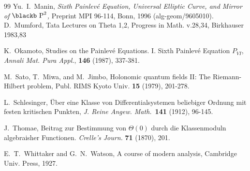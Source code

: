 \documentclass[11pt]{article}
\def\Bbb#1{\hbox{\blackb #1}}
\def\Th{\Theta}
\begin{document}
\begin{thebibliography}{99}
Yu.~I.~Manin,
{\it Sixth Painlev\'e Equation, Universal Elliptic Curve, 
and Mirror of $\Bbb P^2$,}
Preprint MPI 96-114, Bonn, 1996 (alg-geom/9605010).
D.~Mumford, Tata Lectures on Theta 1,2, Progress in Math. v.28,34, Birkhauser 1983,83

K.~Okamoto,
Studies on the Painlev\'e Equations. I. Sixth Painlev\'e Equation $P_{VI}$, 
{\it Annali Mat. Pura Appl.}, {\bf 146} (1987), 337-381.

M.~Sato, T.~Miwa, and M.~Jimbo,
Holonomic quantum fields II: The Riemann-Hilbert problem,
Publ. RIMS Kyoto Univ. {\bf 15} (1979), 201-278.

L.~Schlesinger,
\"Uber eine Klasse von Differentialsystemen beliebiger Ordnung mit
festen kritischen Punkten,
{\it J. Reine Angew. Math.}~{\bf 141} (1912), 96-145.

J.~Thomae, Beitrag zur Bestimmung von $\Th(0)$
durch die Klassenmoduln algebraisher Functionen. {\it Crelle's Journ.}
{\bf 71} (1870), 201.

E.~T.~Whittaker and G.~N.~Watson,
A course of modern analysis,
Cambridge Univ. Press, 1927.
\end{thebibliography}
\end{document}
